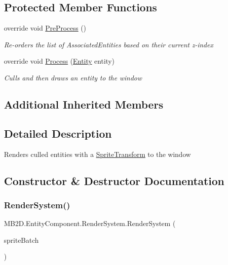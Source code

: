 \subsection*{Protected Member Functions}
\begin{DoxyCompactItemize}
\item 
override void \hyperlink{class_m_b2_d_1_1_entity_component_1_1_render_system_aadd36efe73a5f8cc489894232a5fc201}{Pre\+Process} ()
\begin{DoxyCompactList}\small\item\em Re-\/orders the list of Associated\+Entities based on their current z-\/index \end{DoxyCompactList}\item 
override void \hyperlink{class_m_b2_d_1_1_entity_component_1_1_render_system_a015ba5b16cc227c7a5a16fcc1ffa73b7}{Process} (\hyperlink{class_m_b2_d_1_1_entity_component_1_1_entity}{Entity} entity)
\begin{DoxyCompactList}\small\item\em Culls and then draws an entity to the window \end{DoxyCompactList}\end{DoxyCompactItemize}
\subsection*{Additional Inherited Members}


\subsection{Detailed Description}
Renders culled entities with a \hyperlink{class_m_b2_d_1_1_entity_component_1_1_sprite_transform}{Sprite\+Transform} to the window 



\subsection{Constructor \& Destructor Documentation}
\hypertarget{class_m_b2_d_1_1_entity_component_1_1_render_system_a3f09291aad8620444cc5248def8431b2}{}\label{class_m_b2_d_1_1_entity_component_1_1_render_system_a3f09291aad8620444cc5248def8431b2} 
\subsubsection{\texorpdfstring{Render\+System()}{RenderSystem()}}
{\footnotesize\ttfamily M\+B2\+D.\+Entity\+Component.\+Render\+System.\+Render\+System (\begin{DoxyParamCaption}\item[{Sprite\+Batch}]{sprite\+Batch }\end{DoxyParamCaption})\hspace{0.3cm}{\ttfamily [inline]}}



